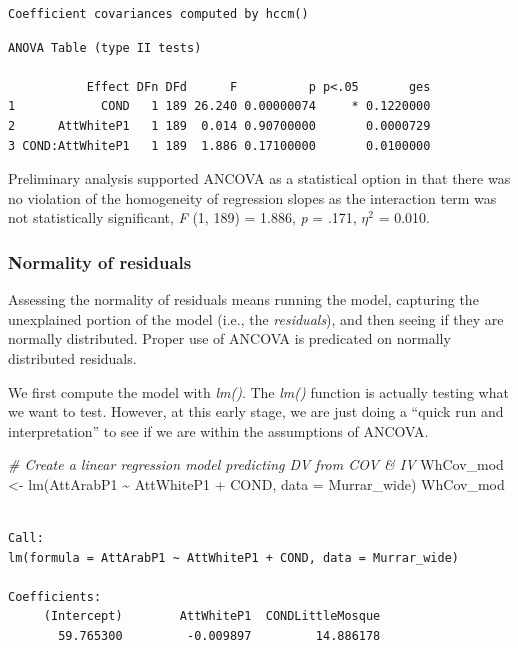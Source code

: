 \documentclass[
  11pt,
]{book}
\newenvironment{Shaded}{\begin{snugshade}}{\end{snugshade}}
\newcommand{\AttributeTok}[1]{\textcolor[rgb]{0.77,0.63,0.00}{#1}}
\newcommand{\CommentTok}[1]{\textcolor[rgb]{0.56,0.35,0.01}{\textit{#1}}}
\newcommand{\FunctionTok}[1]{\textcolor[rgb]{0.00,0.00,0.00}{#1}}
\newcommand{\NormalTok}[1]{#1}
\newcommand{\OtherTok}[1]{\textcolor[rgb]{0.56,0.35,0.01}{#1}}
\newcommand{\SpecialCharTok}[1]{\textcolor[rgb]{0.00,0.00,0.00}{#1}}
\begin{document}
\begin{verbatim}
Coefficient covariances computed by hccm()
\end{verbatim}

\begin{verbatim}
ANOVA Table (type II tests)

           Effect DFn DFd      F          p p<.05       ges
1            COND   1 189 26.240 0.00000074     * 0.1220000
2      AttWhiteP1   1 189  0.014 0.90700000       0.0000729
3 COND:AttWhiteP1   1 189  1.886 0.17100000       0.0100000
\end{verbatim}

Preliminary analysis supported ANCOVA as a statistical option in that there was no violation of the homogeneity of regression slopes as the interaction term was not statistically significant, \emph{F} (1, 189) = 1.886, \emph{p} = .171, \(\eta^2\) = 0.010.

\hypertarget{normality-of-residuals-1}{%
\subsubsection{Normality of residuals}\label{normality-of-residuals-1}}

Assessing the normality of residuals means running the model, capturing the unexplained portion of the model (i.e., the \emph{residuals}), and then seeing if they are normally distributed. Proper use of ANCOVA is predicated on normally distributed residuals.

We first compute the model with \emph{lm()}. The \emph{lm()} function is actually testing what we want to test. However, at this early stage, we are just doing a ``quick run and interpretation'' to see if we are within the assumptions of ANCOVA.

\begin{Shaded}
\begin{Highlighting}[]
\CommentTok{\# Create a linear regression model predicting DV from COV \& IV}
\NormalTok{WhCov\_mod }\OtherTok{\textless{}{-}} \FunctionTok{lm}\NormalTok{(AttArabP1 }\SpecialCharTok{\textasciitilde{}}\NormalTok{ AttWhiteP1 }\SpecialCharTok{+}\NormalTok{ COND, }\AttributeTok{data =}\NormalTok{ Murrar\_wide)}
\NormalTok{WhCov\_mod}
\end{Highlighting}
\end{Shaded}

\begin{verbatim}

Call:
lm(formula = AttArabP1 ~ AttWhiteP1 + COND, data = Murrar_wide)

Coefficients:
     (Intercept)        AttWhiteP1  CONDLittleMosque  
       59.765300         -0.009897         14.886178  
\end{verbatim}
\end{document}
